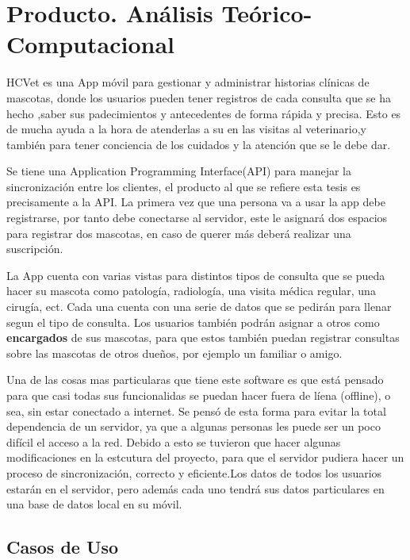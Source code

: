 \chapter{Producto. Análisis Teórico-Computacional}\label{chapter:proposal}

HCVet es una App móvil para gestionar y administrar historias clínicas de mascotas, donde los usuarios pueden tener registros de cada consulta que se ha hecho ,saber sus padecimientos y antecedentes de forma rápida y precisa. Esto es de mucha ayuda a la hora de atenderlas a su en las visitas al veterinario,y también para tener conciencia de los cuidados y la atención que se le debe dar.

Se tiene una Application Programming Interface(API) para manejar la sincronización entre los clientes, el producto al que se refiere esta tesis es precisamente a la API. La primera vez que una persona va a usar la app debe registrarse, por tanto debe conectarse al servidor, este le asignará dos espacios para registrar dos mascotas, en caso de querer más deberá realizar una suscripción.

La App cuenta con varias vistas para distintos tipos de consulta que se pueda hacer su mascota como patología, radiología, una visita médica regular, una cirugía, ect. Cada una cuenta con una serie de datos que se pedirán para llenar segun el tipo de consulta. Los usuarios también podrán asignar a otros como \textbf{encargados} de sus mascotas, para que estos también puedan registrar consultas sobre  las mascotas de otros dueños, por ejemplo un familiar o amigo.

Una de las cosas mas particularas que tiene este software es que está pensado para que casi todas sus funcionalidas se puedan hacer fuera de líena (offline), o sea, sin estar conectado a internet. Se pensó de esta forma para evitar la total dependencia de un servidor, ya que a algunas personas les puede ser un poco difícil el acceso a la red. Debido a esto se tuvieron que hacer algunas modificaciones en la estcutura del proyecto, para que el servidor pudiera hacer un proceso de sincronización, correcto y eficiente.Los datos de todos los usuarios estarán en el servidor, pero además cada uno tendrá sus datos particulares en una base de datos local en su móvil. 

\section{Casos de Uso}

